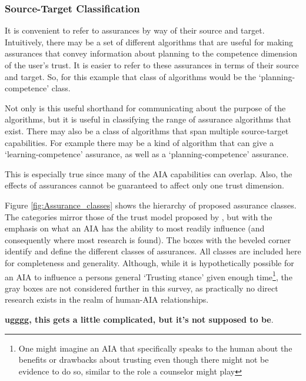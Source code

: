 \subsubsection{Source-Target Classification}
    It is convenient to refer to assurances by way of their source and target. Intuitively, there may be a set of different algorithms that are useful for making assurances that convey information about planning to the competence dimension of the user's trust. It is easier to refer to these assurances in terms of their source and target. So, for this example that class of algorithms would be the `planning-competence' class.
    
    Not only is this useful shorthand for communicating about the purpose of the algorithms, but it is useful in classifying the range of assurance algorithms that exist. There may also be a class of algorithms that span multiple source-target capabilities. For example there may be a kind of algorithm that can give a `learning-competence' assurance, as well as a `planning-competence' assurance.

    This is especially true since many of the AIA capabilities can overlap. Also, the effects of assurances cannot be guaranteed to affect only one trust dimension.

    Figure \ref{fig:Assurance_classes} shows the hierarchy of proposed assurance classes. The categories mirror those of the trust model proposed by \citet{McKnight2001-fa}, but with the emphasis on what an AIA has the ability to most readily influence (and consequently where most research is found). The boxes with the beveled corner identify and define the different classes of assurances. All classes are included here for completeness and generality. Although, while it is hypothetically possible for an AIA to influence a persons general `Trusting stance' given enough time\footnote{One might imagine an AIA that specifically speaks to the human about the benefits or drawbacks about trusting even though there might not be evidence to do so, similar to the role a counselor might play}, the gray boxes are not considered further in this survey, as practically no direct research exists in the realm of human-AIA relationships.


    \textbf{ugggg, this gets a little complicated, but it's not supposed to be}.
